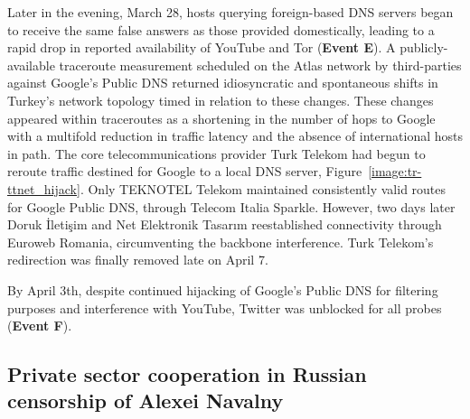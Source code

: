Later in the evening, March 28, hosts querying foreign-based DNS servers began to
receive the same false answers as those provided domestically, leading to a
rapid drop in reported availability of YouTube and Tor (\textbf{Event E}). A
publicly-available traceroute measurement scheduled on the Atlas network by
third-parties against Google's Public DNS returned idiosyncratic and
spontaneous shifts in Turkey's network topology timed in relation to these
changes. These changes appeared within traceroutes as a shortening in the
number of hops to Google with a multifold reduction in traffic latency and the
absence of international hosts in path. The core telecommunications provider
Turk Telekom had begun to reroute traffic destined for Google to a local DNS
server, Figure~\ref{image:tr-ttnet_hijack}. Only TEKNOTEL Telekom maintained
consistently valid routes for Google Public DNS, through Telecom Italia
Sparkle. However, two days later Doruk \.{I}leti\c{s}im and Net Elektronik
Tasar{\i}m reestablished connectivity through Euroweb Romania, circumventing the backbone interference. Turk Telekom's redirection was finally removed late on April 7.

By April 3th, despite continued hijacking of Google's Public DNS for filtering
purposes and interference with YouTube, Twitter was unblocked for all probes
(\textbf{Event F}).

\subsection{Private sector cooperation in Russian censorship of Alexei Navalny}
\label{sec:russia}


